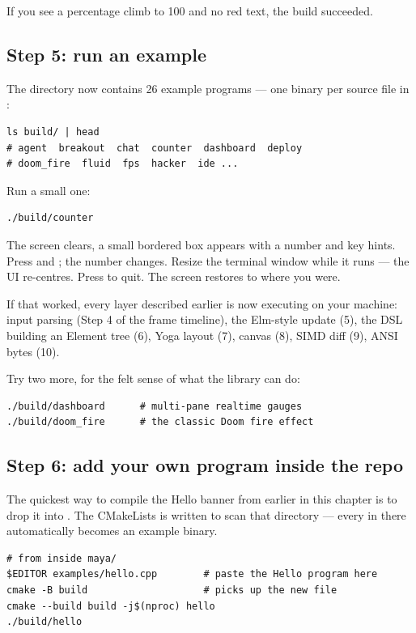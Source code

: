 If you see a percentage climb to 100 and no red text, the build
succeeded.

\subsection{Step 5: run an example}

The  directory now contains 26 example programs --- one
binary per source file in :

\begin{lstlisting}[style=shell]
ls build/ | head
# agent  breakout  chat  counter  dashboard  deploy
# doom_fire  fluid  fps  hacker  ide ...
\end{lstlisting}

Run a small one:

\begin{lstlisting}[style=shell]
./build/counter
\end{lstlisting}

The screen clears, a small bordered box appears with a number and
key hints. Press \code{+} and \code{-}; the number changes. Resize
the terminal window while it runs --- the UI re-centres. Press
 to quit. The screen restores to where you were.

If that worked, every layer described earlier is now executing on
your machine: input parsing (Step 4 of the frame timeline), the
Elm-style update (5), the DSL building an Element tree (6), Yoga
layout (7), canvas (8), SIMD diff (9), ANSI bytes (10).

Try two more, for the felt sense of what the library can do:

\begin{lstlisting}[style=shell]
./build/dashboard      # multi-pane realtime gauges
./build/doom_fire      # the classic Doom fire effect
\end{lstlisting}

\subsection{Step 6: add your own program inside the repo}

The quickest way to compile the Hello banner from earlier in this
chapter is to drop it into . The CMakeLists
is written to scan that directory --- every  in there
automatically becomes an example binary.

\begin{lstlisting}[style=shell]
# from inside maya/
$EDITOR examples/hello.cpp        # paste the Hello program here
cmake -B build                    # picks up the new file
cmake --build build -j$(nproc) hello
./build/hello
\end{lstlisting}

